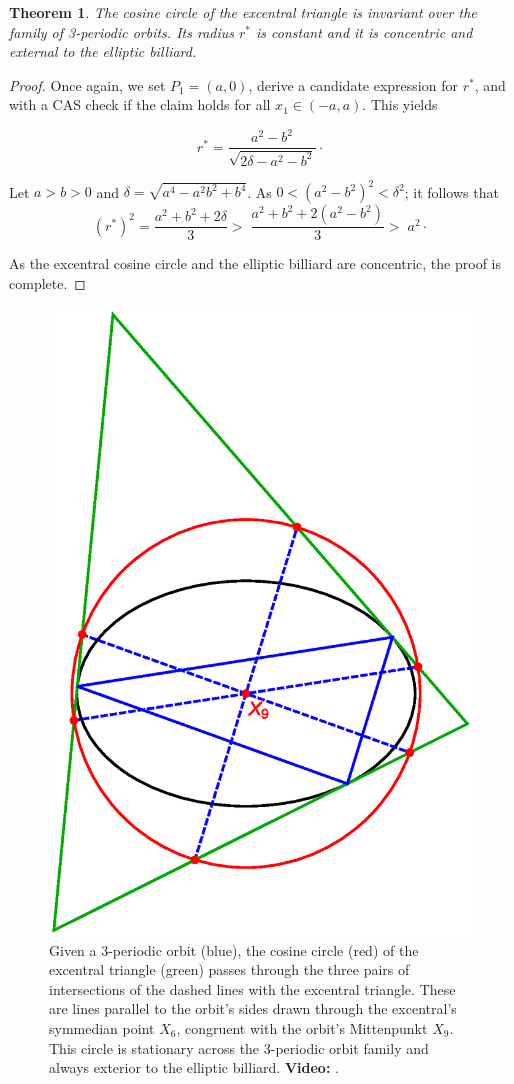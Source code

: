 \documentclass{article}
\newtheorem{theorem}{Theorem}
\theoremstyle{definition}
\begin{document}
\begin{theorem}
The cosine circle of the excentral triangle is invariant over the family of 3-periodic orbits. Its radius $r^*$ is constant and it is concentric and external to the elliptic billiard.
\label{thm:cosine-circle}
\end{theorem}

\begin{proof}
Once again, we set $P_1=(a,0)$, derive a candidate expression for $r^*$, and with a CAS check if the claim holds for all $x_1\in(-a,a)$. This yields

\begin{equation}
r^*=\frac{a^2-b^2}{\sqrt{2\delta-a^2-b^2}}\cdot
\end{equation}

Let $a>b>0$ and $\delta=\sqrt{a^4-a^2 b^2+b^4}$. As $0 < {(a^2-b^2)}^{2}<\delta^2$; it follows that
\begin{equation*} (r^{*})^{2}=  \frac{a^2+ b^2+2\delta}{3}
  > \; \frac{a^2+b^2+2(a^2-b^2)}{3} > \; a^2\cdot
\end{equation*}

As the excentral cosine circle and the elliptic billiard are concentric, the proof is complete.
\end{proof}

\begin{figure}[H]
    \centering
    \includegraphics[width=.65\textwidth]{1080_cosine_circle_locus_antiparallels.eps}
    \caption{Given a 3-periodic orbit (blue), the cosine circle (red) of the excentral triangle (green) passes through the three pairs of intersections of the dashed lines with the excentral triangle. These are lines parallel to the orbit's sides drawn through the excentral's symmedian point $X_6$, congruent with the orbit's Mittenpunkt $X_9$. This circle is stationary across the 3-periodic orbit family and always exterior to the elliptic billiard. \textbf{Video:} \cite[PL\#04]{reznik2020-playlist-proofs}.}
    \label{fig:cos-circle}
\end{figure}
\end{document}
